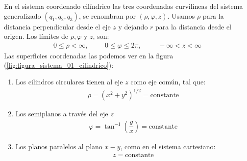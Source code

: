 En el sistema coordenado cilíndrico las tres coordenadas curvilíneas del sistema generalizado $(q_{1}, q_{2}, q_{3})$, se renombran por $(\rho, \varphi, z)$. Usamos $\rho$ para la distancia perpendicular desde el eje $z$ y dejando $r$ para la distancia desde el origen. Los límites de $\rho, \varphi$ y $z$, son:
\begin{align*}
0 \leq \rho < \infty, \hspace{1cm} 0 \leq \varphi \leq 2 \pi, \hspace{1cm} -\infty < z < \infty
\end{align*}
Las superficies coordenadas las podemos ver en la figura (\ref{fig:figura_sistema_01_cilindrico}):
\begin{enumerate}
\item Los cilindros circulares tienen al eje $z$ como eje común, tal que:
\begin{align*}
\rho =  (x^{2} + y^{2})^{1/2} = \text{constante}
\end{align*}
\item Los semiplanos a través del eje $z$
\begin{align*}
\varphi = \tan^{-1} \left(\dfrac{y}{x} \right) = \text{constante}
\end{align*}
\item Los planos paralelos al plano $x-y$, como en el sistema cartesiano:
\begin{align*}
z = \text{constante}
\end{align*}
\end{enumerate}
